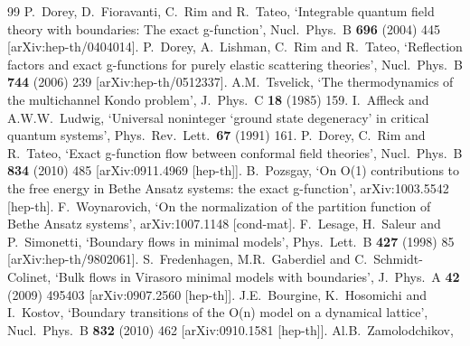 \documentclass[11pt]{article}
\begin{document}
\bigskip
\medskip

\begin{thebibliography}{99} 
\parskip 1pt
%
  P.~Dorey, D.~Fioravanti, C.~Rim and R.~Tateo,
  `Integrable quantum field theory with boundaries: The exact
  g-function',
  Nucl.\ Phys.\  B {\bf 696} (2004) 445
  [arXiv:hep-th/0404014].
%
  P.~Dorey, A.~Lishman, C.~Rim and R.~Tateo,
  `Reflection factors and exact g-functions for purely elastic
  scattering theories',
  Nucl.\ Phys.\  B {\bf 744} (2006) 239
  [arXiv:hep-th/0512337].
%
 A.M.~Tsvelick,
 `The thermodynamics of the multichannel Kondo problem',
 J.\ Phys.\ C {\bf 18} (1985) 159.
%
  I.~Affleck and A.W.W.~Ludwig,
  `Universal noninteger `ground state degeneracy' in critical
  quantum systems',
  Phys.\ Rev.\ Lett.\  {\bf 67} (1991) 161.
%
  P.~Dorey, C.~Rim and R.~Tateo,
  `Exact g-function flow between conformal field theories',
  Nucl.\ Phys.\  B {\bf 834} (2010) 485
  [arXiv:0911.4969 [hep-th]].
%
  B.~Pozsgay,
  `On O(1) contributions to the free energy in Bethe Ansatz systems:
  the exact g-function',
  arXiv:1003.5542 [hep-th].
%
  F.~Woynarovich,
  `On the normalization of the partition function of Bethe Ansatz
  systems',
  arXiv:1007.1148 [cond-mat].
%
  F.~Lesage, H.~Saleur and P.~Simonetti,
  `Boundary flows in minimal models',
  Phys.\ Lett.\  B {\bf 427} (1998) 85
  [arXiv:hep-th/9802061].
%
  S.~Fredenhagen, M.R.~Gaberdiel and C.~Schmidt-Colinet,
  `Bulk flows in Virasoro minimal models with boundaries',
  J.\ Phys.\ A  {\bf 42} (2009) 495403
  [arXiv:0907.2560 [hep-th]].
%
  J.E.~Bourgine, K.~Hosomichi and I.~Kostov,
  `Boundary transitions of the O(n) model on a dynamical lattice',
  Nucl.\ Phys.\  B {\bf 832} (2010) 462
  [arXiv:0910.1581 [hep-th]].
%
  Al.B.~Zamolodchikov,

\end{thebibliography}
\end{document}
